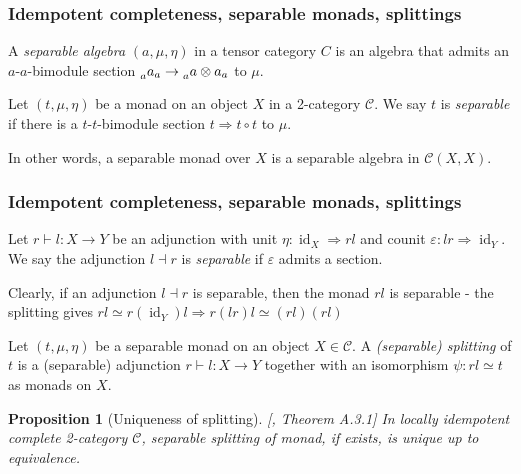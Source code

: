 \documentclass{beamer}
\newcommand{\tnsr}{\otimes}
\newcommand{\veps}{{\varepsilon}}
\DeclareMathOperator{\id}{id}
\newtheorem{proposition}[theorem]{Proposition}
\newcommand{\cC}{{\mathcal{C}}}
\begin{document}
\begin{frame}
\frametitle{Idempotent completeness, separable monads, splittings}

\pause

\begin{definition}
A \emph{separable algebra} $(a,\mu,\eta)$ in a tensor category $C$
is an algebra that admits an $a$-$a$-bimodule section
$\prescript{}{a}a_a \to \prescript{}{a}a \tnsr a_a$
to $\mu$.
\end{definition}

\pause

\begin{definition}
Let $(t, \mu, \eta)$ be a monad on an object $X$
in a 2-category $\cC$.
We say $t$ is \emph{separable} if there is a
$t$-$t$-bimodule section
$t \Rightarrow t \circ t$ to $\mu$.
\end{definition}

\pause

In other words, a separable monad over $X$
is a separable algebra in $\cC(X,X)$.

\end{frame}

\begin{frame}
\frametitle{Idempotent completeness, separable monads, splittings}

\begin{definition}
Let $r \vdash l: X \to Y$ be an adjunction
with unit $\eta: \id_X \Rightarrow rl$
and counit $\veps: lr \Rightarrow \id_Y$.
We say the adjunction $l \dashv r$ is \emph{separable}
if $\veps$ admits a section.
\end{definition}

\pause

Clearly, if an adjunction $l \dashv r$ is separable,
then the monad $rl$ is separable -
the splitting gives
$rl \simeq r(\id_Y)l \Rightarrow r(lr)l \simeq (rl)(rl)$

\pause

\begin{definition}
Let $(t,\mu,\eta)$ be a separable monad on
an object $X \in \cC$.
A \emph{(separable) splitting} of $t$ is a (separable) adjunction
$r \vdash l: X \to Y$
together with an isomorphism
$\psi: rl \simeq t$ as monads on $X$.
\end{definition}

\pause


\begin{proposition}[Uniqueness of splitting]
[\cite{DRfusion}, Theorem A.3.1]
\label{p:splitting-unique}
In locally idempotent complete 2-category $\cC$,
separable splitting of monad,
if exists,
is unique up to equivalence.
\end{proposition}


\end{frame}
\end{document}
